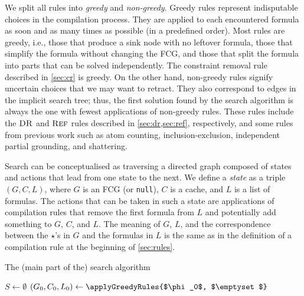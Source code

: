 We split all rules into \emph{greedy} and \emph{non-greedy}. Greedy rules
represent indisputable choices in the compilation process. They are applied to
each encountered formula as soon and as many times as possible (in a predefined
order). Most rules are greedy, i.e., those that produce a sink node with no
leftover formula, those that simplify the formula without changing the FCG, and
those that split the formula into parts that can be solved independently. The
constraint removal rule described in \cref{sec:cr} is greedy. On the other hand,
non-greedy rules signify uncertain choices that we may want to retract. They
also correspond to edges in the implicit search tree; thus, the first solution
found by the search algorithm is always the one with fewest applications of
non-greedy rules. These rules include the $\operatorname{\textsc{DR}}$ and $\operatorname{\textsc{Ref}}$ rules described in
\cref{sec:dr,sec:ref}, respectively, and some rules from previous work
\citep{DBLP:conf/ijcai/BroeckTMDR11} such as atom counting, inclusion-exclusion,
independent partial grounding, and shattering.

Search can be conceptualised as traversing a directed graph composed of states
and actions that lead from one state to the next. We define a \emph{state} as a
triple $(G, C, L)$, where $G$ is an FCG (or \texttt{null}), $C$ is a cache, and
$L$ is a list of formulas. The actions that can be taken in such a state are
applications of compilation rules that remove the first formula from $L$ and
potentially add something to $G$, $C$, and $L$. The meaning of $G$, $L$, and the
correspondence between the $\star$'s in $G$ and the formulas in $L$ is the same
as in the definition of a compilation rule at the beginning of \cref{sec:rules}.

\begin{algorithm}
  \caption{The (main part of the) search algorithm}
  \label{alg:search}
    $S \gets \emptyset$\;
  $(G_0, C_0, L_0) \gets \applyGreedyRules{$\phi_0$, $\emptyset$}$\;\label{line:greedy}
   
\end{algorithm}

